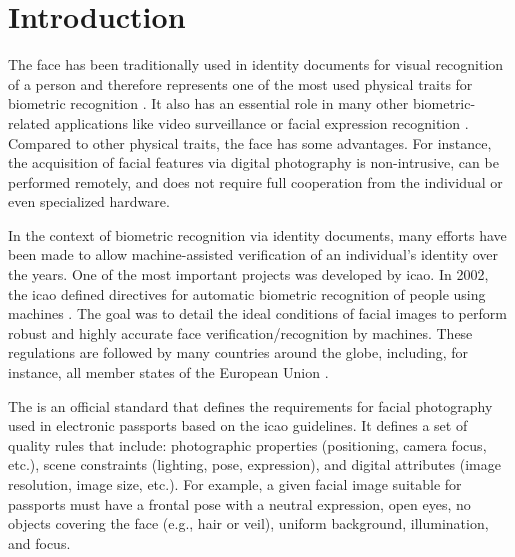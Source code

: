 \section{Introduction}

The face has been traditionally used in identity documents for visual recognition of a person and therefore represents one of the most used physical traits for biometric recognition \citep{ferrara2012face}. It also has an essential role in many other biometric-related applications like video surveillance \citep{de2015partially} or facial expression recognition \citep{anil2016literature}. Compared to other physical traits, the face has some advantages. For instance, the acquisition of facial features via digital photography is non-intrusive, can be performed remotely, and does not require full cooperation from the individual or even specialized hardware.


In the context of biometric recognition via identity documents, many efforts have been made to allow machine-assisted verification of an individual's identity over the years. One of the most important projects was developed by \acf{icao}. In 2002, the \acs{icao} defined directives for automatic biometric recognition of people using machines \citep{icao2003report}. The goal was to detail the ideal conditions of facial images to perform robust and highly accurate face verification/recognition by machines. These regulations are followed by many countries around the globe, including, for instance, all member states of the European Union \citep{ebinger2008international}.

The \icao \citep{iso-iec} is an official standard that defines the requirements for facial photography used in electronic passports based on the \acs{icao} guidelines. It defines a set of quality rules that include: photographic properties (positioning, camera focus, etc.), scene constraints (lighting, pose, expression), and digital attributes (image resolution, image size, etc.). For example, a given facial image suitable for passports must have a frontal pose with a neutral expression, open eyes, no objects covering the face (e.g., hair or veil), uniform background, illumination, and focus.

